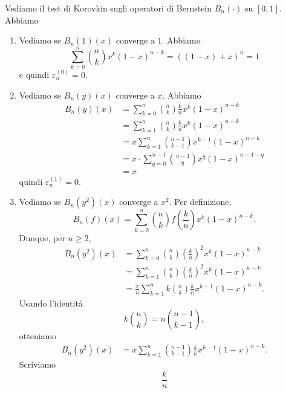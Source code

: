 \documentclass[a4paper]{article}
\begin{document}
Vediamo il test di Korovkin sugli operatori di Bernstein \(B_n(\cdot)\) su \([0,1]\). Abbiamo
\begin{enumerate}
    \item Vediamo se \(B_n(1)(x)\) converge a \(1\). Abbiamo
        \[
            \sum_{k=0}^n \binom{n}{k}x^k(1-x)^{n-k} = ((1 - x) + x)^n = 1
        \]
        e quindi \(\varepsilon_n^{(0)} = 0\).
    \item Vediamo se \(B_n(y)(x)\) converge a \(x\). Abbiamo
        \begin{align*}
            B_n(y)(x) &= \sum_{k=0}^n \binom{n}{k} \frac{k}{n} x^k(1-x)^{n-k} \\
            &= \sum_{k=1}^n \binom{n}{k} \frac{k}{n} x^k(1-x)^{n-k} \\
            &= x\sum_{k=1}^n \binom{n-1}{k-1} x^{k-1}(1-x)^{n-k} \\
            &= x \cdot \sum_{q = 0}^{n-1} \binom{n-1}{q} x^q (1-x)^{n-1-q} \\
            &= x
        \end{align*}
        quindi \(\varepsilon_n^{(1)} = 0\).
    \item Vediamo se \(B_n(y^2)(x)\) converge a \(x^2\). Per definizione,
        \[
            B_n(f)(x)
            =
            \sum_{k=0}^{n}
            \binom{n}{k}
            f\left(\frac{k}{n}\right)
            x^k(1-x)^{n-k}.
        \]
        Dunque, per \(n\geq 2\),
        \begin{align*}
            B_n(y^2)(x)
            &=
            \sum_{k=0}^{n}
            \binom{n}{k}
            \left(\frac{k}{n}\right)^2
            x^k(1-x)^{n-k} \\
            &=
            \sum_{k=1}^{n}
            \binom{n}{k}
            \left(\frac{k}{n}\right)^2
            x^k(1-x)^{n-k} \\
            &=
            \frac{x}{n}
            \sum_{k=1}^{n}
            k
            \binom{n}{k}
            \frac{k}{n}
            x^{k-1}(1-x)^{n-k}.
        \end{align*}
        Usando l'identità
        \[
            k\binom{n}{k}
            =
            n\binom{n-1}{k-1},
        \]
        otteniamo
        \begin{align*}
            B_n(y^2)(x)
            &=
            x
            \sum_{k=1}^{n}
            \binom{n-1}{k-1}
            \frac{k}{n}
            x^{k-1}(1-x)^{n-k}.
        \end{align*}
        Scriviamo
        \[
            \frac{k}{n}
\]
\end{enumerate}
\end{document}
